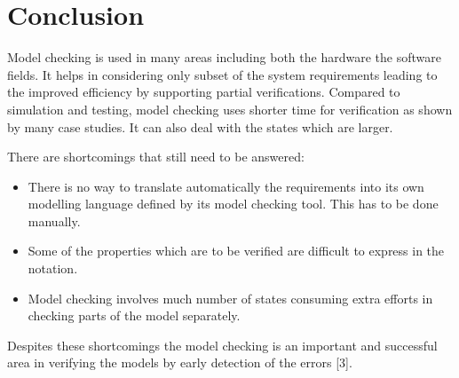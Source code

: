 \documentclass{article}
\begin{document}
\section{Conclusion}

Model checking is used in many areas including both the hardware the software fields. It helps in considering only subset of the system requirements leading to the improved efficiency by supporting partial verifications. Compared to simulation and testing, model checking uses shorter time for verification as shown by many case studies. It can also deal with the states which are larger.


There are shortcomings that still need to be answered:
\begin{itemize}
\item There is no way to translate automatically the requirements into its own modelling language defined by its model checking tool. This has to be done manually.
\item Some of the properties which are to be verified are difficult to express in the notation.
\item Model checking involves much number of states consuming extra efforts in checking parts of the model separately.
\end{itemize}
Despites these shortcomings the model checking is an important and successful area in verifying the models by early detection of the errors [3].
\end{document}
